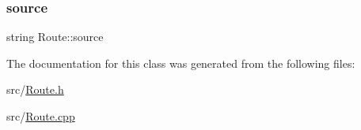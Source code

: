 \hypertarget{classRoute_a1534a1a4697d382624b37e9b8e18558c}{}\label{classRoute_a1534a1a4697d382624b37e9b8e18558c} 
\subsubsection{\texorpdfstring{source}{source}}
{\footnotesize\ttfamily string Route\+::source\hspace{0.3cm}{\ttfamily [private]}}



The documentation for this class was generated from the following files\+:\begin{DoxyCompactItemize}
\item 
src/\hyperlink{Route_8h}{Route.\+h}\item 
src/\hyperlink{Route_8cpp}{Route.\+cpp}\end{DoxyCompactItemize}
